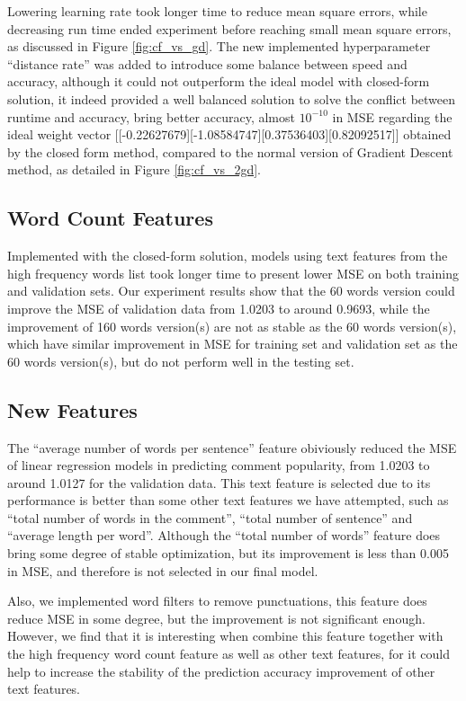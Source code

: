 \documentclass[letterpaper, 11pt]{article}
\begin{document}
Lowering learning rate took longer time to reduce mean square errors, while decreasing run time ended experiment before reaching small mean square errors, as discussed in Figure \ref{fig:cf_vs_gd}. The new implemented hyperparameter ``distance rate'' was added to introduce some balance between speed and accuracy, although it could not outperform the ideal model with closed-form solution, it indeed provided a well balanced solution to solve the conflict between runtime and accuracy, bring better accuracy, almost $ 10^{-10} $ in MSE regarding the ideal weight vector [[-0.22627679][-1.08584747][0.37536403][0.82092517]] obtained by the closed form method, compared to the normal version of Gradient Descent method, as detailed in Figure \ref{fig:cf_vs_2gd}.

\subsection*{Word Count Features}

Implemented with the closed-form solution, models using text features from the high frequency words list took longer time to present lower MSE on both training and validation sets. Our experiment results show that the 60 words version could improve the MSE of validation data from 1.0203 to around 0.9693, while the improvement of 160 words version(s) are not as stable as the 60 words version(s), which have similar improvement in MSE for training set and validation set as the 60 words version(s), but do not perform well in the testing set.
 
\subsection*{New Features}

The ``average number of words per sentence'' feature obiviously reduced the MSE of linear regression models in predicting comment popularity, from 1.0203 to around 1.0127 for the validation data. This text feature is selected due to its performance is better than some other text features we have attempted, such as ``total number of words in the comment'', ``total number of sentence'' and ``average length per word''. Although the ``total number of words'' feature does bring some degree of stable optimization, but its improvement is less than 0.005 in MSE, and therefore is not selected in our final model.

Also, we implemented word filters to remove punctuations, this feature does reduce MSE in some degree, but the improvement is not significant enough. However, we find that it is interesting when combine this feature together with the high frequency word count feature as well as other text features, for it could help to increase the stability of the prediction accuracy improvement of other text features.
\end{document}
